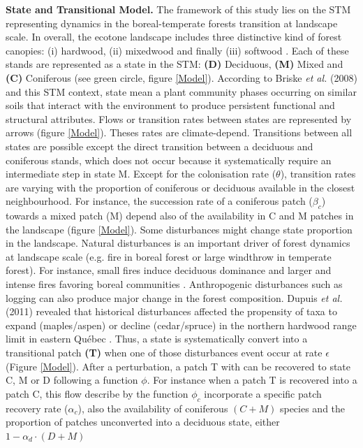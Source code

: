 \textbf{State and Transitional Model.} The framework of this study lies on the
STM representing dynamics in the boreal-temperate forests transition at
landscape scale.  In overall, the ecotone landscape includes three distinctive
kind of forest canopies: (i) hardwood, (ii) mixedwood and finally (iii)
softwood \cite{Fisichelli2013}. Each of these stands are represented as a
state in the STM: \textbf{(D)} Deciduous, \textbf{(M)} Mixed and \textbf{(C)}
Coniferous (see green circle, figure \ref{Model}). According to Briske\textit{
et al.} (2008) and this STM context, state mean a plant community phases
occurring on similar soils that interact with the environment to produce
persistent functional and structural attributes. Flows or transition rates
between states are represented by arrows (figure \ref{Model}). Theses rates
are climate-depend. Transitions between all states are possible  except the
direct transition between a deciduous and coniferous stands, which does not
occur because it systematically require an intermediate step in state M.
Except for the colonisation rate ($\theta$), transition rates are varying with
the proportion of coniferous or deciduous available in the closest
neighbourhood. For instance, the succession rate of a coniferous patch
($\beta_c$) towards a mixed patch (M) depend also of the availability in C and
M patches in the landscape (figure \ref{Model}). Some disturbances might
change state proportion in the landscape. Natural disturbances is an important
driver of forest dynamics at landscape scale (e.g. fire in boreal forest or
large windthrow in temperate forest). For instance, small fires induce
deciduous dominance and larger and intense fires favoring boreal communities
\cite{Bergeron2004}. Anthropogenic disturbances such as logging can also
produce major change in the forest composition. Dupuis \textit{et al.} (2011)
revealed that historical disturbances affected the propensity of taxa to
expand (maples/aspen) or decline (cedar/spruce) in the northern hardwood range
limit in eastern Québec \cite{Dupuis2011}. Thus, a state is systematically
convert into a transitional patch \textbf{(T)} when one of those disturbances
event occur at rate $\epsilon$ (Figure \ref{Model}). After a perturbation, a
patch T with can be recovered to state C, M or D following a function $\phi$.
For instance when a patch T is recovered into a patch C, this flow describe by
the function $\phi_c$ incorporate a specific patch recovery rate ($\alpha_c$),
also the availability of coniferous $(C + M)$ species and the proportion of
patches unconverted into a deciduous state, either $1- \alpha_d \cdot (D + M)$
